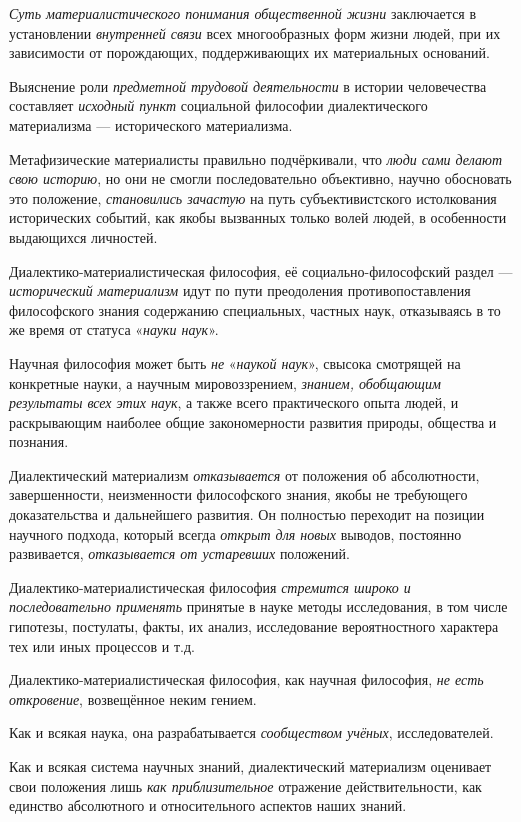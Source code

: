 \documentclass[a4paper,14pt,russian]{extreport}
\begin{document}
\emph{Суть материалистического понимания общественной жизни} заключается в установлении \emph{внутренней связи} всех многообразных форм жизни людей, при их зависимости от порождающих, поддерживающих их материальных оснований.

Выяснение роли \emph{предметной трудовой деятельности} в истории человечества составляет \emph{исходный пункт} социальной философии диалектического материализма --- исторического материализма.

Метафизические материалисты правильно подчёркивали, что \emph{люди сами делают свою историю}, но они не смогли последовательно объективно, научно обосновать это положение, \emph{становились зачастую} на путь субъективистского истолкования исторических событий, как якобы вызванных только волей людей, в особенности выдающихся личностей.

Диалектико-материалистическая философия, её социально-философский раздел --- \emph{исторический материализм} идут по пути преодоления противопоставления философского знания содержанию специальных, частных наук, отказываясь в то же время от статуса «\emph{науки наук}».

Научная философия может быть \emph{не} «\emph{наукой наук}», свысока смотрящей на конкретные науки, а научным мировоззрением, \emph{знанием, обобщающим результаты всех этих наук}, а также всего практического опыта людей, и раскрывающим наиболее общие закономерности развития природы, общества и познания.

Диалектический материализм \emph{отказывается} от положения об абсолютности, завершенности, неизменности философского знания, якобы не требующего доказательства и дальнейшего развития. Он полностью переходит на позиции научного подхода, который всегда \emph{открыт для новых} выводов, постоянно развивается, \emph{отказывается от устаревших} положений.

Диалектико-материалистическая философия \emph{стремится широко и последовательно применять} принятые в науке методы исследования, в том числе гипотезы, постулаты, факты, их анализ, исследование вероятностного характера тех или иных процессов и т.д.

Диалектико-материалистическая философия, как научная философия, \emph{не есть откровение}, возвещённое неким гением.

Как и всякая наука, она разрабатывается \emph{сообществом учёных}, исследователей.

Как и всякая система научных знаний, диалектический материализм оценивает свои положения лишь \emph{как приблизительное} отражение действительности, как единство абсолютного и относительного аспектов наших знаний.
\end{document}
